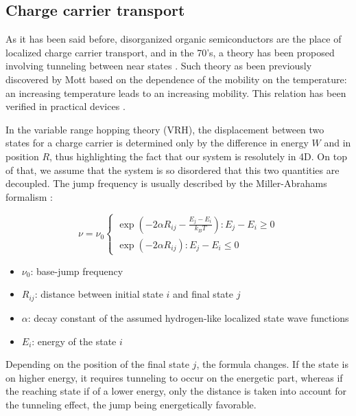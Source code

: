 \subsection{Charge carrier transport}

As it has been said before, disorganized organic semiconductors are the place of localized charge carrier transport, and in the 70's, a theory has been proposed involving tunneling between near states \cite{hopping_theory_1}. Such theory as been previously discovered by Mott based on the dependence of the mobility on the temperature: an increasing temperature leads to an increasing mobility. This relation has been verified in practical devices \cite{hopping_theory_1,multiple_theory}.

In the variable range hopping theory (VRH), the displacement between two states for a charge carrier is determined only by the difference in energy $W$ and in position $R$, thus highlighting the fact that our system is resolutely in 4D. On top of that, we assume that the system is so disordered that this two quantities are decoupled. The jump frequency is usually described by the Miller-Abrahams formalism \cite{miller}:

\begin{equation}
    \nu=\nu_{0}\left\{\begin{array}{r}
    \exp \left(-2 \alpha R_{i j}-\frac{E_{j}-E_{i}}{k_{B} T}\right): E_{j}-E_{i} \geq 0 \\
    \exp \left(-2 \alpha R_{i j}\right): E_{j}-E_{i} \leq 0
    \end{array}\right.
    \label{eq:1}
\end{equation}

\begin{itemize}
    \setlength\itemsep{0.1em}
    \item $\nu_0$: base-jump frequency
    \item $R_{i j}$: distance between initial state $i$ and final state $j$
    \item $\alpha$: decay constant of the assumed hydrogen-like localized state wave functions
    \item $E_i$: energy of the state $i$
\end{itemize}

Depending on the position of the final state $j$, the formula changes. If the state is on higher energy, it requires tunneling to occur on the energetic part, whereas if the reaching state if of a lower energy, only the distance is taken into account for the tunneling effect, the jump being energetically favorable.

